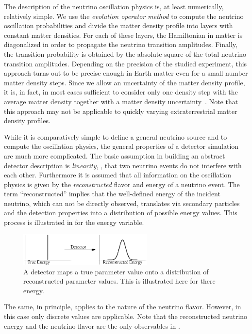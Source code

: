 The description of the neutrino oscillation physics is, at least numerically, relatively simple. We use the {\em evolution operator method} to compute the neutrino oscillation probabilities and divide the matter density profile into layers with constant matter densities. For each of these layers, the Hamiltonian in matter is diagonalized in order to propagate the neutrino transition amplitudes. Finally, the transition probability is obtained by the absolute square of the total neutrino transition amplitudes. Depending on the precision of the studied experiment, this approach turns out to be precise enough in Earth matter even for a small number matter density steps. Since we allow an uncertainty of the matter density profile, it is, in fact, in most cases sufficient to consider only one density step with the average matter density together with a matter density uncertainty~\cite{Ohlsson:2003ip}. Note that this approach may not be applicable to quickly varying extraterrestrial matter density profiles.

While it is comparatively simple to define a general neutrino source 
and to compute the oscillation physics, the general properties of a detector simulation are much more complicated. The basic assumption in building an abstract detector description is \emph{linearity}, \ie , that two neutrino events do not interfere with each other. Furthermore it is assumed that all information on the oscillation physics 
is given by the \emph{reconstructed} flavor and energy of a 
neutrino event. The term ``reconstructed'' implies that the well-defined energy of the incident neutrino, which can not be directly observed, translates via secondary particles and the detection properties into a distribution of possible energy values. This process is illustrated in  for the energy variable. 
%
\begin{figure}[ht]
\begin{center}
\includegraphics[width=0.6\textwidth]{mapping}
\end{center}
\caption{\label{fig:distro} A detector maps a true parameter value onto
a distribution of reconstructed parameter values. This is illustrated here for there energy.}
\end{figure}
% 
The same, in principle, applies to the nature of the neutrino flavor. However, in this case only discrete values are applicable. Note that the reconstructed neutrino energy and the neutrino flavor are the only observables in \GLOBES .

